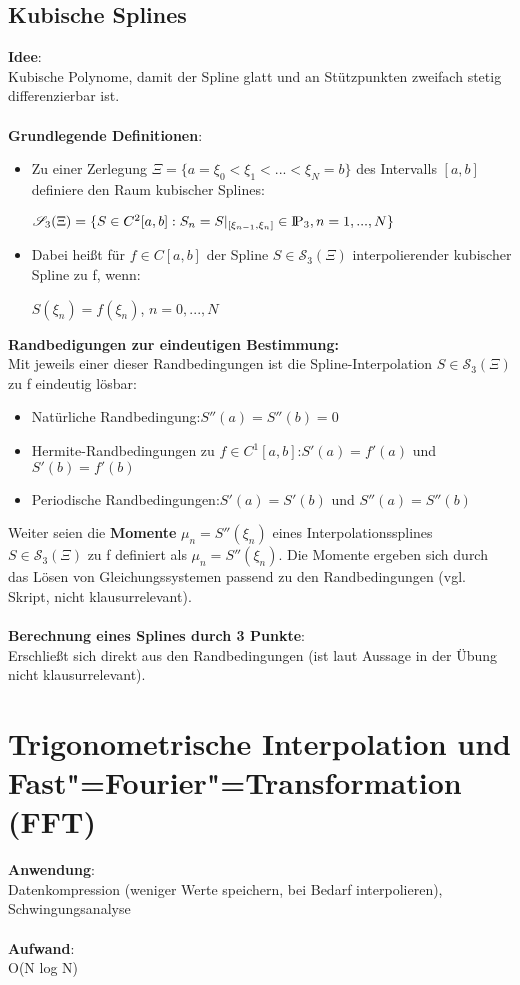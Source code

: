 \documentclass[10pt,a4paper]{article}
\def\polynomials{{\rm I\!P}}
\begin{document}
	\subsection{Kubische Splines}
	\textbf{Idee}:\\Kubische Polynome, damit der Spline glatt und an Stützpunkten zweifach stetig differenzierbar ist.\\\\
	\textbf{Grundlegende Definitionen}:
	\begin{itemize}
		\item Zu einer Zerlegung $\Xi = \{a = \xi_0 < \xi_1 < ... < \xi_N = b\}$ des Intervalls $[a, b]$ definiere den Raum kubischer Splines:
		\begin{center}
			$\mathscr{S}_3(\Xi) = \{S \in C^2[a, b]: S_n = S|_{[\xi_{n-1}, \xi_n]} \in \polynomials_3, n = 1, ..., N\}$
		\end{center}
		\item Dabei heißt für $f \in C[a, b]$ der Spline $S \in \mathscr{S}_3(\Xi)$ interpolierender kubischer Spline zu f, wenn:
		\begin{center}
			$S(\xi_n) = f(\xi_n)$, $n = 0, ..., N$
		\end{center}
	\end{itemize}
	\textbf{Randbedigungen zur eindeutigen Bestimmung:}\\
	Mit jeweils einer dieser Randbedingungen ist die Spline-Interpolation $S \in \mathscr{S}_3(\Xi)$ zu f eindeutig lösbar:
	\begin{itemize}
		\item Natürliche Randbedingung:\hfill$S''(a) = S''(b) = 0$
		\item Hermite-Randbedingungen zu $f \in C^1[a, b]$:\hfill$S'(a) = f'(a)$ und $S'(b) = f'(b)$
		\item Periodische Randbedingungen:\hfill$S'(a) = S'(b)$ und $S''(a) = S''(b)$
	\end{itemize}
	Weiter seien die \textbf{Momente} $\mu_n = S''(\xi_n)$ eines Interpolationssplines $S \in \mathscr{S}_3(\Xi)$ zu f definiert als $\mu_n = S''(\xi_n)$. Die Momente ergeben sich durch das Lösen von Gleichungssystemen passend zu den Randbedingungen (vgl. Skript, nicht klausurrelevant).\\\\
	\textbf{Berechnung eines Splines durch 3 Punkte}:\\
	Erschließt sich direkt aus den Randbedingungen (ist laut Aussage in der Übung nicht klausurrelevant).
	\section{Trigonometrische Interpolation und Fast"=Fourier"=Transformation (FFT)}
	\textbf{Anwendung}:\\Datenkompression (weniger Werte speichern, bei Bedarf interpolieren), Schwingungsanalyse\\\\
	\textbf{Aufwand}:\\O(N log N)
	
\end{document}
